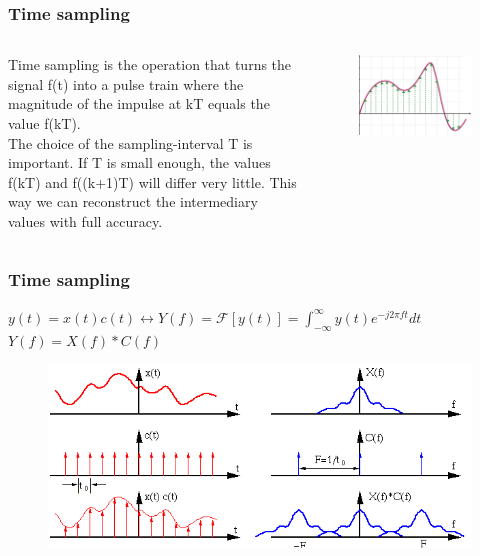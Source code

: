 \begin{frame}
	\frametitle{Time sampling}
	\begin{columns}
		Time sampling is the operation that turns the signal f(t) into a pulse train where the magnitude of the impulse at kT equals the value f(kT).\\
		\medskip
		The choice of the sampling-interval T is important. If T is small enough, the values f(kT) and f((k+1)T) will differ very little. This way we can reconstruct the intermediary values with full accuracy.
		\begin{figure}
			\includegraphics[width=1\linewidth]{signal}
		\end{figure}
	\end{columns}
\end{frame}

\begin{frame}
	\frametitle{Time sampling}
	$y(t) = x(t)c(t) \leftrightarrow Y(f) = \mathcal{F}[y(t)] = \int_{-\infty}^{\infty} y(t)e^{-j2\pi ft} dt$ \\
	$Y(f) = X(f)*C(f)$
	\begin{figure}
		\includegraphics[width=1\linewidth]{time_sampling}
	\end{figure}
\end{frame}

